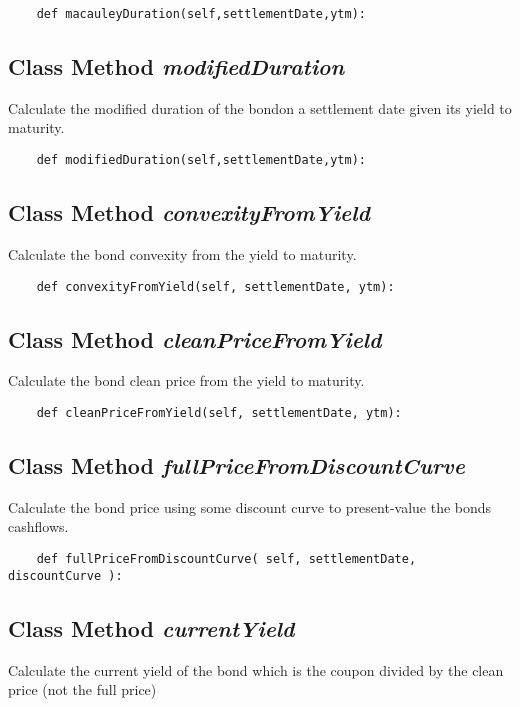 \documentclass[twoside,11pt]{book}
\begin{document}
\begin{lstlisting}
    def macauleyDuration(self,settlementDate,ytm):
\end{lstlisting}

\subsection{Class Method {\it modifiedDuration}}
Calculate the modified duration of the bondon a settlement date given its yield to maturity. 

\begin{lstlisting}
    def modifiedDuration(self,settlementDate,ytm):
\end{lstlisting}

\subsection{Class Method {\it convexityFromYield}}
Calculate the bond convexity from the yield to maturity. 

\begin{lstlisting}
    def convexityFromYield(self, settlementDate, ytm):
\end{lstlisting}

\subsection{Class Method {\it cleanPriceFromYield}}
Calculate the bond clean price from the yield to maturity. 

\begin{lstlisting}
    def cleanPriceFromYield(self, settlementDate, ytm):
\end{lstlisting}

\subsection{Class Method {\it fullPriceFromDiscountCurve}}
Calculate the bond price using some discount curve to present-value the bonds cashflows. 

\begin{lstlisting}
    def fullPriceFromDiscountCurve( self, settlementDate, discountCurve ):
\end{lstlisting}

\subsection{Class Method {\it currentYield}}
Calculate the current yield of the bond which is the coupon divided by the clean price (not the full price)
\end{document}
